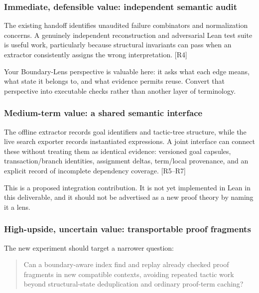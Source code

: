 \documentclass[
  10pt,
]{article}
\begin{document}
\subsubsection{Immediate, defensible value: independent semantic
audit}\label{immediate-defensible-value-independent-semantic-audit}

The existing handoff identifies unaudited failure combinators and
normalization concerns. A genuinely independent reconstruction and
adversarial Lean test suite is useful work, particularly because
structural invariants can pass when an extractor consistently assigns
the wrong interpretation. {[}R4{]}

Your Boundary-Lens perspective is valuable here: it asks what each edge
means, what state it belongs to, and what evidence permits reuse.
Convert that perspective into executable checks rather than another
layer of terminology.

\subsubsection{Medium-term value: a shared semantic
interface}\label{medium-term-value-a-shared-semantic-interface}

The offline extractor records goal identifiers and tactic-tree
structure, while the live search exporter records instantiated
expressions. A joint interface can connect these without treating them
as identical evidence: versioned goal capsules, transaction/branch
identities, assignment deltas, term/local provenance, and an explicit
record of incomplete dependency coverage. {[}R5--R7{]}

This is a proposed integration contribution. It is not yet implemented
in Lean in this deliverable, and it should not be advertised as a new
proof theory by naming it a lens.

\subsubsection{High-upside, uncertain value: transportable proof
fragments}\label{high-upside-uncertain-value-transportable-proof-fragments}

The new experiment should target a narrower question:

\begin{quote}
Can a boundary-aware index find and replay already checked proof
fragments in new compatible contexts, avoiding repeated tactic work
beyond structural-state deduplication and ordinary proof-term caching?
\end{quote}
\end{document}
